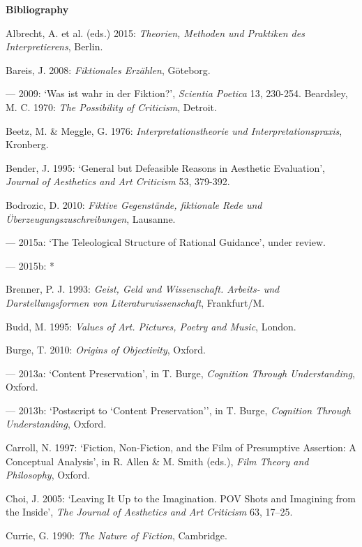 \vspace{.2cm}
\noindent\textbf{\large Bibliography}
\vspace{.2cm}

\footnotesize
\linespread{1.0}

\begin{hangparas}{.5cm}{1}

Albrecht, A. et al. (eds.) 2015: \emph{Theorien, Methoden und Praktiken des Interpretierens}, Berlin.

Bareis, J. 2008: \emph{Fiktionales Erz\"ahlen}, G\"oteborg.

--- 2009: `Was ist wahr in der Fiktion?', \emph{Scientia Poetica} 13, 230-254. 
Beardsley, M. C. 1970: \emph{The Possibility of Criticism}, Detroit.

Beetz, M. \& Meggle, G. 1976: \emph{Interpretationstheorie und Interpretationspraxis}, Kronberg.

Bender, J. 1995: `General but Defeasible Reasons in Aesthetic Evaluation', \emph{Journal of Aesthetics and Art Criticism} 53, 379-392. 

Bodrozic, D. 2010: \emph{Fiktive Gegenst\"ande, fiktionale Rede und \"Uberzeugungszuschreibungen}, Lausanne.

--- 2015a: `The Teleological Structure of Rational Guidance', under review.

--- 2015b: *

Brenner, P. J. 1993: \emph{Geist, Geld und Wissenschaft. Arbeits- und Darstellungsformen von Literaturwissenschaft}, Frankfurt/M.

Budd, M. 1995: \emph{Values of Art. Pictures, Poetry and Music}, London. 

Burge, T. 2010: \emph{Origins of Objectivity}, Oxford.

--- 2013a: `Content Preservation', in T. Burge, \emph{Cognition Through Understanding}, Oxford.

--- 2013b: `Postscript to `Content Preservation'', in T. Burge, \emph{Cognition Through Understanding}, Oxford.

Carroll, N. 1997: `Fiction, Non-Fiction, and the Film of Presumptive Assertion: A Conceptual Analysis', in R. Allen \& M. Smith (eds.), \emph{Film Theory and Philosophy}, Oxford.

Choi, J. 2005: `Leaving It Up to the Imagination. POV Shots and Imagining from the Inside', \emph{The Journal of Aesthetics and Art Criticism} 63, 17--25. 

Currie, G. 1990: \emph{The Nature of Fiction}, Cambridge. 


\end{hangparas}
